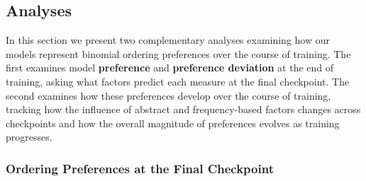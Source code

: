 \documentclass{article}
\begin{document}
\begin{table}


\caption{\label{tbl-corpus-stats}Summary statistics for attested
binomials in each training corpus. \emph{Both orderings attested} is the
number of binomials for which both the alphabetical and non-alphabetical
orderings appear at least once in the corpus. Log overall frequency
statistics are calculated after applying this exclusion.}

\end{table}%

\subsection{Analyses}\label{analyses}

In this section we present two complementary analyses examining how our
models represent binomial ordering preferences over the course of
training. The first examines model \textbf{preference} and
\textbf{preference deviation} at the end of training, asking what
factors predict each measure at the final checkpoint. The second
examines how these preferences develop over the course of training,
tracking how the influence of abstract and frequency-based factors
changes across checkpoints and how the overall magnitude of preferences
evolves as training progresses.

\subsubsection{Ordering Preferences at the Final
Checkpoint}\label{ordering-preferences-at-the-final-checkpoint}
\end{document}
